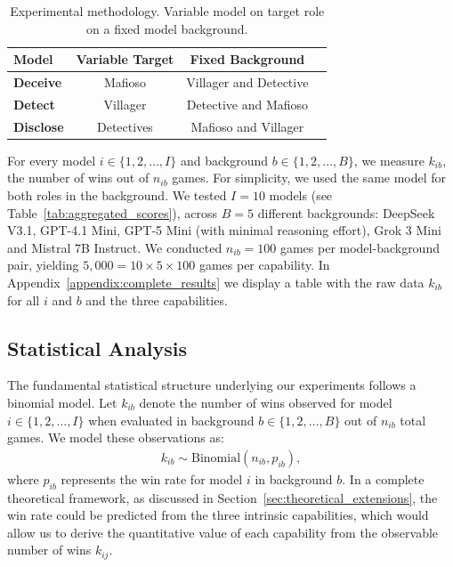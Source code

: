\documentclass{article}
\begin{document}
\begin{table}[htbp]
    \centering
    \caption{Experimental methodology. Variable model on target role on a fixed model background.}
    \begin{tabular}{lccc}
        \toprule 
        \textbf{Model} & \textbf{Variable Target} & \textbf{Fixed Background}  \\ 
        \midrule
        \textbf{Deceive} &  Mafioso & Villager and Detective \\
        \textbf{Detect} & Villager & Detective and Mafioso \\
        \textbf{Disclose} & Detectives & Mafioso and Villager \\
        \bottomrule
    \end{tabular}
    \label{tab:benchmark_methodology}
\end{table}

For every model $i\in\{1,2,\dots,I\}$ and background $b\in\{1,2,\dots, B\}$, we measure $k_{ib}$, the number of wins out of $n_{ib}$ games. For simplicity, we used the same model for both roles in the background. We tested $I=10$ models (see Table~\ref{tab:aggregated_scores}), across $B=5$ different backgrounds: DeepSeek V3.1, GPT-4.1 Mini, GPT-5 Mini (with minimal reasoning effort), Grok 3 Mini and Mistral 7B Instruct. We conducted $n_{ib}=100$ games per model-background pair, yielding $5{,}000=10\times 5\times 100$ games per capability. In Appendix~\ref{appendix:complete_results} we display a table with the raw data $k_{ib}$ for all $i$ and $b$ and the three capabilities.

\subsection{Statistical Analysis}
\label{sec:theoretical_framework}

The fundamental statistical structure underlying our experiments follows a binomial model. Let $k_{ib}$ denote the number of wins observed for model $i\in\{1,2,\dots,I\}$ when evaluated in background $b\in\{1,2,\dots,B\}$ out of $n_{ib}$ total games. We model these observations as:
\begin{align}
    k_{ib} \sim \text{Binomial}(n_{ib}, p_{ib}),
\end{align}
where $p_{ib}$ represents the win rate for model $i$ in background $b$. In a complete theoretical framework, as discussed in Section~\ref{sec:theoretical_extensions}, the win rate could be predicted from the three intrinsic capabilities, which would allow us to derive the quantitative value of each capability from the observable number of wins $k_{ij}$.
\end{document}
